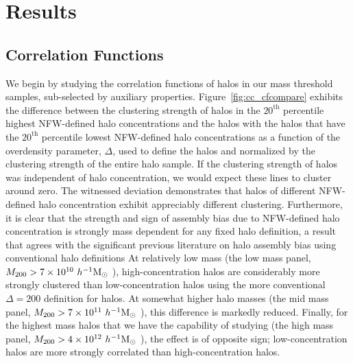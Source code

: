 \documentclass[usenatbib]{mnras}
\begin{document}
\section[]{Results}
\label{section:results}


\subsection{Correlation Functions}
\label{sub:cfresults}

We begin by studying the correlation functions of halos in our mass threshold samples, sub-selected by auxiliary
properties. Figure~\ref{fig:cc_cfcompare} exhibits the difference between the clustering strength of halos in the
$20^{\mathrm{th}}$ percentile highest NFW-defined halo concentrations and the halos with the halos that have the
$20^{\mathrm{th}}$ percentile lowest NFW-defined halo concentrations as a function of the overdensity parameter, $\Delta$, used to
define the halos and normalized by the clustering strength of the entire halo
sample.  
If the clustering strength of halos was independent of halo concentration, we 
would expect these lines to cluster around zero. The witnessed deviation
demonstrates that halos of different NFW-defined halo concentration exhibit appreciably different clustering. 
Furthermore, it is clear that the strength and sign of assembly bias due to NFW-defined halo concentration is 
strongly mass dependent for any fixed halo definition, 
a result that agrees with the significant previous literature on halo assembly bias using conventional halo definitions 
\citep{wechsler_etal02, gao_etal05, zentner07, wechsler_etal06, harker_etal06, croton_etal07, dalal_etal08, mao_etal15, sunayama_etal16} 
At relatively low mass (the low mass panel, 
$M_{200} > 7 \times 10^{10} \ h^{-1}\mathrm{M}_{\odot}~$), high-concentration halos are considerably 
more strongly clustered than low-concentration halos using the more 
conventional $\Delta = 200$ definition for halos. At somewhat higher halo masses 
(the mid mass panel, $M_{200} > 7\times 10^{11} \ h^{-1}\mathrm{M}_{\odot}~$), this difference is markedly reduced. 
Finally, for the highest mass halos that we have
the capability of studying (the high mass panel, $M_{200} > 4 \times 10^{12} \ h^{-1}\mathrm{M}_{\odot}~$), 
the effect is of opposite sign; low-concentration halos are more strongly correlated 
than high-concentration halos.
\end{document}
